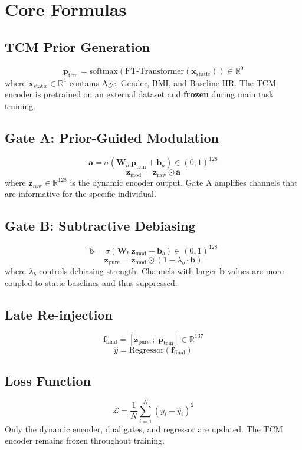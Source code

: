 \section*{Core Formulas}

\subsection*{TCM Prior Generation}
\begin{equation}
    \mathbf{p}_{\mathrm{tcm}} = \mathrm{softmax}\!\left(\mathrm{FT\text{-}Transformer}(\mathbf{x}_{\mathrm{static}})\right) \in \mathbb{R}^{9}
\end{equation}
where $\mathbf{x}_{\mathrm{static}} \in \mathbb{R}^{4}$ contains Age, Gender, BMI, and Baseline HR.
The TCM encoder is pretrained on an external dataset and \textbf{frozen} during main task training.

\subsection*{Gate A: Prior-Guided Modulation}
\begin{equation}
    \mathbf{a} = \sigma\!\left(\mathbf{W}_a \, \mathbf{p}_{\mathrm{tcm}} + \mathbf{b}_a\right) \in (0,1)^{128}
\end{equation}
\begin{equation}
    \mathbf{z}_{\mathrm{mod}} = \mathbf{z}_{\mathrm{raw}} \odot \mathbf{a}
\end{equation}
where $\mathbf{z}_{\mathrm{raw}} \in \mathbb{R}^{128}$ is the dynamic encoder output.
Gate A amplifies channels that are informative for the specific individual.

\subsection*{Gate B: Subtractive Debiasing}
\begin{equation}
    \mathbf{b} = \sigma\!\left(\mathbf{W}_b \, \mathbf{z}_{\mathrm{mod}} + \mathbf{b}_b\right) \in (0,1)^{128}
\end{equation}
\begin{equation}
    \mathbf{z}_{\mathrm{pure}} = \mathbf{z}_{\mathrm{mod}} \odot (1 - \lambda_b \cdot \mathbf{b})
\end{equation}
where $\lambda_b$ controls debiasing strength.
Channels with larger $\mathbf{b}$ values are more coupled to static baselines and thus suppressed.

\subsection*{Late Re-injection}
\begin{equation}
    \mathbf{f}_{\mathrm{final}} = \left[\mathbf{z}_{\mathrm{pure}} \; ; \; \mathbf{p}_{\mathrm{tcm}}\right] \in \mathbb{R}^{137}
\end{equation}
\begin{equation}
    \hat{y} = \mathrm{Regressor}(\mathbf{f}_{\mathrm{final}})
\end{equation}

\subsection*{Loss Function}
\begin{equation}
    \mathcal{L} = \frac{1}{N}\sum_{i=1}^{N}\left(y_i - \hat{y}_i\right)^2
\end{equation}
Only the dynamic encoder, dual gates, and regressor are updated.
The TCM encoder remains frozen throughout training.

